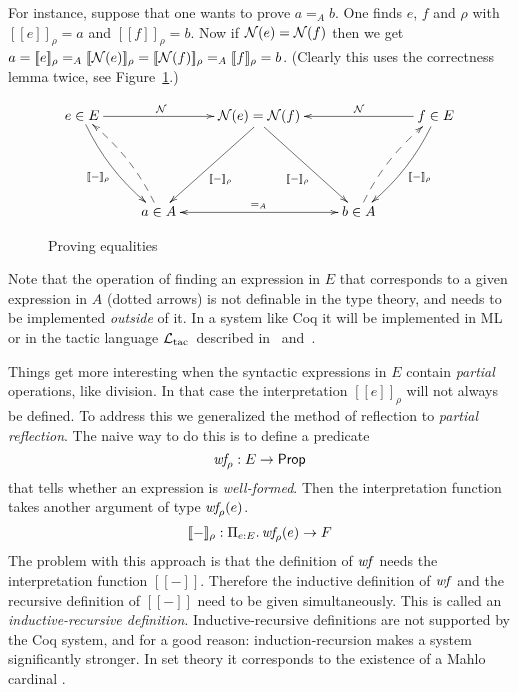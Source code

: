 \documentclass[runningheads]{llncs}
\newcommand{\inte}[1]{[\![#1]\!]}
\newcommand{\intfun}[1]{\inte{#1}_\rho}
\newcommand{\Ltac}{${\cal L}_{\rm tac}$}
\newcommand{\N}{{\cal N}}
\newcommand{\eqbdi}{=}
\newcommand{\wf}{{\it wf}}
\newcommand{\wfrho}{{\it wf\!}_\rho}
\newcommand{\Prop}{{\textsf{Prop}}}
\begin{document}
For instance, suppose that one wants to prove $a =_A b$.
One finds $e$, $f$ and $\rho$ with $\intfun{e} \eqbdi a$ and
$\intfun{f} \eqbdi b$.
Now if $\N(e) \eqbdi \N(f)$ then
we get $a \eqbdi \intfun{e} =_A \intfun{\N(e)} \eqbdi \intfun{\N(f)} =_A \intfun{f} \eqbdi b$.
(Clearly this uses the correctness lemma twice, see Figure~\ref{fig:tactic}.)
\begin{figure}
\[
\xymatrix{
 e\in E\ar[rr]^{\N\ \ \ \ }\ar@/_/[ddr]_{\intfun{-}} &&
  \N(e)=\N(f)\ar[]+DL+<1cm,0pt>;[ddl]^{\intfun{-}}\ar[]+DR-<1cm,0cm>;[ddr]_{\intfun{-}} &&
  f\in E\ar[ll]_{\ \ \ \ \ \N}\ar@/^/[ddl]^{\intfun{-}} \\ \\
 & a\in A\ar@/_/@{-->}[uul]\ar@{<->}[rr]^{=_A} && b\in A\ar@/^/@{-->}[uur]
}
\]
\caption{Proving equalities}\label{fig:tactic}
\end{figure}
\noindent
Note that the operation of finding an expression in $E$ that
corresponds to a given expression in $A$ (dotted arrows) is not
definable in the type theory, and needs to be implemented
\emph{outside} of it.  In a system like Coq it will be
implemented in ML or in the tactic language \Ltac\ described
in~\cite{del:00} and~\cite[Chapter~9]{coqmanual}.

Things get more interesting when the syntactic expressions in $E$ contain
\emph{partial} operations, like division.
In that case the interpretation $\intfun{e}$ will not always be defined.
To address this we generalized the method of reflection to \emph{partial
reflection}.
The naive way to do this is to define a predicate
$$\wfrho : E \to \Prop$$
that tells whether an expression is \emph{well-formed}.
Then the interpretation function takes another argument of type $\wfrho(e)$.
$$\intfun{-} : \Pi_{e:E}.\, \wfrho(e) \to F$$
The problem with this approach is that the definition of $\wf$
needs the interpretation function $\inte{-}$.
Therefore the inductive definition of $\wf$ and the recursive definition
of $\inte{-}$ need to be given simultaneously.
This is called an \emph{inductive-recursive definition}.
Inductive-recursive definitions are not supported by the Coq system,
and for a good reason:
induction-recursion makes a system significantly stronger.
In set theory it corresponds to the existence of a Mahlo
cardinal \cite{dyb:set:03}.
\end{document}
